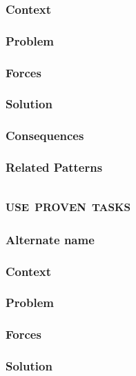 \documentclass[prodmode]{style/acmlarge}
\begin{document}
\subsubsection*{Context}

\subsubsection*{Problem}

\subsubsection*{Forces}

\subsubsection*{Solution}

\subsubsection*{Consequences}

\subsubsection*{Related Patterns}



\subsection{\textsc{\textbf{use proven tasks}}}

\subsubsection*{Alternate name}

\subsubsection*{Context}

\subsubsection*{Problem}

\subsubsection*{Forces}

\subsubsection*{Solution}
\end{document}
